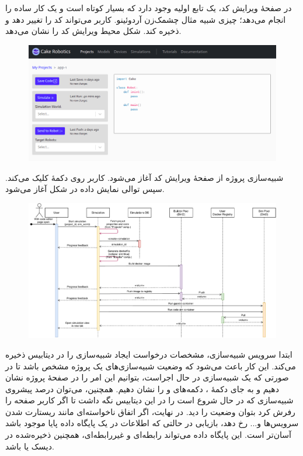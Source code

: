 \documentclass{cake-classes/short-report-fa}
\newcommand{\ورب}[1]{\lr{\Verb!#1!}}
\begin{document}
در صفحهٔ ویرایش کد، یک تابع  اولیه وجود دارد که بسیار کوتاه است و یک کار ساده را انجام می‌دهد؛ چیزی شبیه مثال چشمک‌زن آردوئینو. کاربر می‌تواند کد را تغییر دهد و ذخیره کند. شکل  محیط ویرایش کد را نشان می‌دهد.
 
\begin{figure}[h]
	\centering
	\includegraphics[width=\linewidth]{img/code-editor.png}
\end{figure}

\clearpage
{}

شبیه‌سازی پروژه از صفحهٔ ویرایش کد آغاز می‌شود. کاربر روی دکمهٔ  کلیک می‌کند. سپس توالی نمایش داده در شکل  آغاز می‌شود.

\begin{figure}
	\centering
	\includegraphics[width=\linewidth]{img/seq-start-sim.pdf}
\end{figure}

ابتدا سرویس شبیه‌سازی، مشخصات درخواست ایجاد شبیه‌سازی را در دیتابیس ذخیره می‌کند. این کار باعث می‌شود که وضعیت شبیه‌سازی‌های یک پروژه مشخص باشد تا در صورتی که یک شبیه‌سازی در حال اجراست، بتوانیم این امر را در صفحهٔ پروژه نشان دهیم و به جای دکمهٔ ، دکمه‌های  و  را نشان دهیم. همچنین، می‌توان درصد پیشروی شبیه‌سازی که در حال شروع است را در این دیتابیس نگه داشت تا اگر کاربر صفحه را رفرش کرد بتوان وضعیت را دید. در نهایت، اگر اتفاق ناخواسته‌ای مانند ریستارت شدن سرویس‌ها و... رخ دهد، بازیابی در حالتی که اطلاعات در یک پایگاه داده پایا موجود باشد آسان‌تر است. این پایگاه داده می‌تواند رابطه‌ای و غیررابطه‌ای، همچنین ذخیره‌شده در دیسک یا  باشد.
\end{document}

